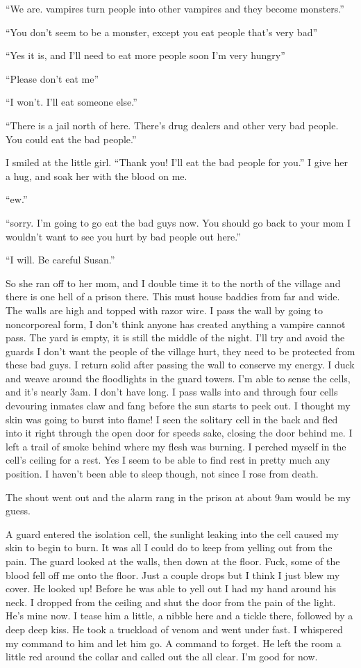 ``We are. vampires turn people into other vampires and they become monsters.''

``You don't seem to be a monster, except you eat people that's very bad''

``Yes it is, and I'll need to eat more people soon I'm very hungry''

``Please don't eat me''

``I won't. I'll eat someone else.''

``There is a jail north of here. There's drug dealers and other very bad people. You could eat the bad people.''

I smiled at the little girl. ``Thank you! I'll eat the bad people for you.'' I give her a hug, and soak her with the blood on me.

``ew.''

``sorry. I'm going to go eat the bad guys now. You should go back to your mom I wouldn't want to see you hurt by bad people out here.''

``I will. Be careful Susan.''

So she ran off to her mom, and I double time it to the north of the village and there is one hell of a prison there. This must house baddies from far and wide. The walls are high and topped with razor wire. I pass the wall by going to noncorporeal form, I don't think anyone has created anything a vampire cannot pass. The yard is empty, it is still the middle of the night. I'll try and avoid the guards I don't want the people of the village hurt, they need to be protected from these bad guys. I return solid after passing the wall to conserve my energy. I duck and weave around the floodlights in the guard towers. I'm able to sense the cells, and it's nearly 3am. I don't have long. I pass walls into and through four cells devouring inmates claw and fang before the sun starts to peek out. I thought my skin was going to burst into flame! I seen the solitary cell in the back and fled into it right through the open door for speeds sake, closing the door behind me. I left a trail of smoke behind where my flesh was burning. I perched myself in the cell's ceiling for a rest. Yes I seem to be able to find rest in pretty much any position. I haven't been able to sleep though, not since I rose from death.

The shout went out and the alarm rang in the prison at about 9am would be my guess.

A guard entered the isolation cell, the sunlight leaking into the cell caused my skin to begin to burn. It was all I could do to keep from yelling out from the pain. The guard looked at the walls, then down at the floor. Fuck, some of the blood fell off me onto the floor. Just a couple drops but I think I just blew my cover. He looked up! Before he was able to yell out I had my hand around his neck. I dropped from the ceiling and shut the door from the pain of the light. He's mine now. I tease him a little, a nibble here and a tickle there, followed by a deep deep kiss. He took a truckload of venom and went under fast. I whispered my command to him and let him go. A command to forget. He left the room a little red around the collar and called out the all clear. I'm good for now.

